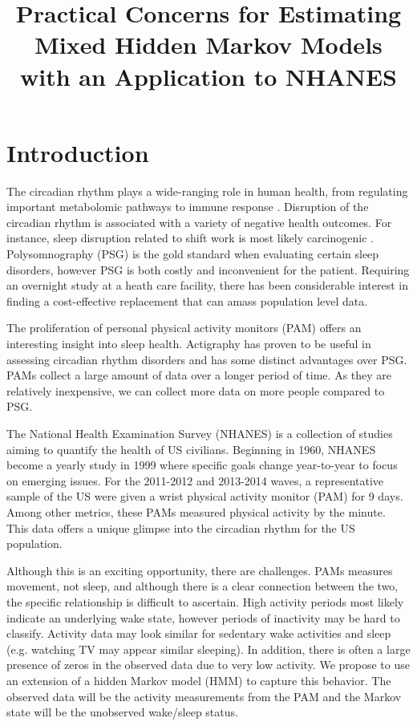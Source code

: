 \documentclass{article}
\title{Practical Concerns for Estimating Mixed Hidden Markov Models with an Application to NHANES}
\author{}
\date{}
\begin{document}
\maketitle

\section{Introduction}

The circadian rhythm plays a wide-ranging role in human health, from regulating important metabolomic pathways \cite{potterCircadianRhythmSleep2016} to immune response \cite{sharmaCircadianRhythmDisruption2016}. Disruption of the circadian rhythm is associated with a variety of negative health outcomes. For instance, sleep disruption related to shift work is most likely carcinogenic \cite{iarc2010}. Polysomnography (PSG) is the gold standard when evaluating certain sleep disorders, however PSG is both costly and inconvenient for the patient\cite{chervin1999}. Requiring an overnight study at a heath care facility, there has been considerable interest in finding a cost-effective replacement that can amass population level data. 

The proliferation of personal physical activity monitors (PAM) offers an interesting insight into sleep health. Actigraphy has proven to be useful in assessing circadian rhythm disorders \cite{morgenthaler2007} and has some distinct advantages over PSG. PAMs collect a large amount of data over a longer period of time. As they are relatively inexpensive, we can collect more data on more people compared to PSG. 

The National Health Examination Survey (NHANES) is a collection of studies aiming to quantify the health of US civilians. Beginning in 1960, NHANES become a yearly study in 1999 where specific goals change year-to-year to focus on emerging issues. For the 2011-2012 and 2013-2014 waves, a representative sample of the US were given a wrist physical activity monitor (PAM) for 9 days. Among other metrics, these PAMs measured physical activity by the minute. This data offers a unique glimpse into the circadian rhythm for the US population.

Although this is an exciting opportunity, there are challenges. PAMs measures movement, not sleep, and although there is a clear connection between the two, the specific relationship is difficult to ascertain. High activity periods most likely indicate an underlying wake state, however periods of inactivity may be hard to classify. Activity data may look similar for sedentary wake activities and sleep (e.g. watching TV may appear similar sleeping). In addition, there is often a large presence of zeros in the observed data due to very low activity. We propose to use an extension of a hidden Markov model (HMM) to capture this behavior. The observed data will be the activity measurements from the PAM and the Markov state will be the unobserved wake/sleep status.
\end{document}
